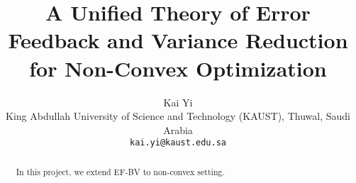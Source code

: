 \documentclass{article} %
\title{A Unified Theory of Error Feedback and Variance Reduction for Non-Convex Optimization}
\author{Kai Yi\\
   King Abdullah University of Science and Technology (KAUST), Thuwal, Saudi Arabia\\
   \texttt{kai.yi@kaust.edu.sa}
}
\newcommand{\sybg}[1]{{\sf\green#1}\xspace}  %
\newcommand{\sybr}[1]{{\sf\red#1}\xspace}  %
\theoremstyle{plain}
\theoremstyle{definition}
\theoremstyle{remark}
\newcommand{\green}{\color{mydarkgreen}}
\newcommand{\red}{\color{mydarkred}}
\begin{document}
\maketitle


\begin{abstract}  
In this project, we extend EF-BV to non-convex setting. 
\end{abstract}

\tableofcontents







\end{document}
